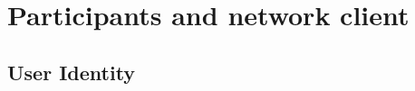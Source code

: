 
\section{Participants and network client}
\label{sc:participantsandnodes}

\subsection{User Identity}
\label{ssc:accounts}


